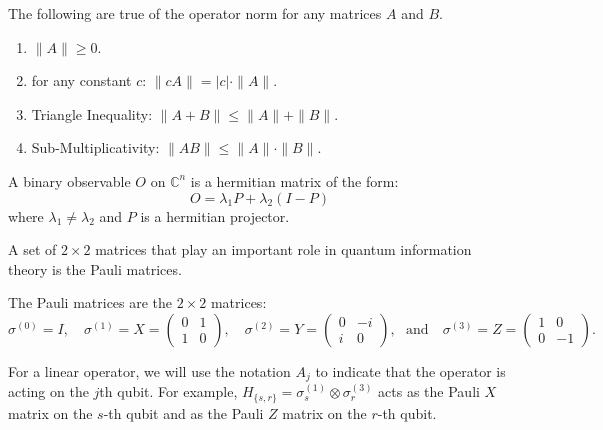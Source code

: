 \begin{fact}
    The following are true of the operator norm for any matrices $A$ and $B$.
    \begin{enumerate}
        \item $\|A\| \geq 0$.
        \item for any constant $c$: $\|cA\| = |c| \cdot \|A\|$.
        \item Triangle Inequality: $\|A + B\| \leq \|A\| + \|B\|$.
        \item Sub-Multiplicativity: $\|AB\| \leq \|A\| \cdot \|B\|$.
    \end{enumerate}
\end{fact}

\begin{definition}
A binary observable $O$ on $\mathbb{C}^n$ is a hermitian matrix of the form:
\begin{equation}
    O = \lambda_1 P + \lambda_2 (I - P)
\end{equation}
where $\lambda_1 \neq \lambda_2$ and $P$ is a hermitian projector.
\end{definition}

\noindent A set of $2\times 2$ matrices that play an important role in quantum information theory is the Pauli matrices.

\begin{definition}
    The Pauli matrices are the $2\times 2$ matrices:
    \begin{equation}
        \sigma^{(0)} = I, \quad \sigma^{(1)} = X = \begin{pmatrix} 0 & 1 \\ 1 & 0 \end{pmatrix}, \quad \sigma^{(2)} = Y = \begin{pmatrix} 0 & -i \\ i & 0 \end{pmatrix}, \,\, \text{ and} \quad \sigma^{(3)} = Z = \begin{pmatrix} 1 & 0 \\ 0 & -1 \end{pmatrix}.
    \end{equation}
\end{definition}

\noindent For a linear operator, we will use the notation $A_j$ to indicate that the operator is acting on the $j$th qubit. For example, $H_{\{s, r\}} = \sigma^{(1)}_{s} \otimes \sigma^{(3)}_r$ acts as the Pauli $X$ matrix on the $s$-th qubit and as the Pauli $Z$ matrix on the $r$-th qubit.

